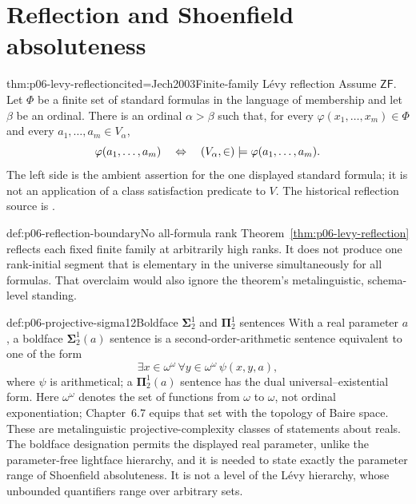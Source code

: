 \section{Reflection and Shoenfield absoluteness}
\label{sec:p06-reflection-absoluteness}

\begin{hbtheorem}{thm:p06-levy-reflection}{cited=Jech2003}{Finite-family L\'evy reflection}
Assume \(\mathsf{ZF}\).  Let \(\Phi\) be a finite set of standard formulas in
the language of membership and let \(\beta\) be an ordinal.  There is an
ordinal \(\alpha>\beta\) such that, for every
\(\varphi(x_1,\ldots,x_m)\in\Phi\) and every
\(a_1,\ldots,a_m\in V_\alpha\),
\[
  \varphi(a_1,\ldots,a_m)
  \quad\Leftrightarrow\quad
  (V_\alpha,\in)\models
    \varphi(a_1,\ldots,a_m).
\]
The left side is the ambient assertion for the one displayed standard
formula; it is not an application of a class satisfaction predicate to
\(V\).
The historical reflection source is \cite{Levy1960}.
\end{hbtheorem}

\begin{proofboundary}{def:p06-reflection-boundary}{No all-formula rank}
Theorem~\ref{thm:p06-levy-reflection} reflects each fixed finite family at
arbitrarily high ranks.  It does not produce one rank-initial segment that is
elementary in the universe simultaneously for all formulas.  That overclaim would
also ignore the theorem's metalinguistic, schema-level standing.
\end{proofboundary}

\begin{hbdefinition}{def:p06-projective-sigma12}{Boldface \(\boldsymbol\Sigma^1_2\) and \(\boldsymbol\Pi^1_2\) sentences}
With a real parameter \(a\), a boldface \(\boldsymbol\Sigma^1_2(a)\) sentence
is a second-order-arithmetic sentence equivalent to one of the form
\[
  \exists x\in\omega^\omega\,
  \forall y\in\omega^\omega\,
  \psi(x,y,a),
\]
where \(\psi\) is arithmetical; a
\(\boldsymbol\Pi^1_2(a)\) sentence has the dual universal--existential form.
Here \(\omega^\omega\) denotes the set of functions from \(\omega\) to
\(\omega\), not ordinal exponentiation; Chapter~6.7 equips that set with the
topology of Baire space.
These are metalinguistic projective-complexity classes of statements about
reals.  The boldface designation permits the displayed real parameter, unlike
the parameter-free lightface hierarchy, and it is needed to state exactly the
parameter range of Shoenfield absoluteness.  It is not a level of the L\'evy
hierarchy, whose unbounded quantifiers range over arbitrary sets.
\end{hbdefinition}

